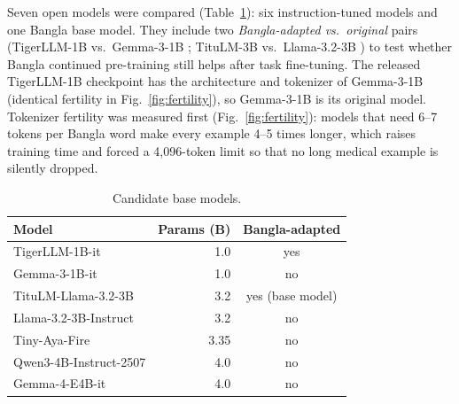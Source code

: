 Seven open models were compared (Table~\ref{tab:candidates}): six instruction-tuned models and one Bangla base model. They include two \emph{Bangla-adapted vs.\ original} pairs (TigerLLM-1B \cite{raihan2025tigerllm} vs.\ Gemma-3-1B \cite{gemma3}; TituLM-3B \cite{titulm2025} vs.\ Llama-3.2-3B \cite{meta2024llama32}) to test whether Bangla continued pre-training still helps after task fine-tuning. The released TigerLLM-1B checkpoint has the architecture and tokenizer of Gemma-3-1B (identical fertility in Fig.~\ref{fig:fertility}), so Gemma-3-1B is its original model. Tokenizer fertility was measured first (Fig.~\ref{fig:fertility}): models that need 6--7 tokens per Bangla word make every example 4--5 times longer, which raises training time and forced a 4,096-token limit so that no long medical example is silently dropped.

\begin{table}[!t]
\centering
\caption{Candidate base models.}
\label{tab:candidates}
\scriptsize
\begin{tabular}{@{}lrc@{}}
\toprule
Model & Params (B) & Bangla-adapted \\
\midrule
TigerLLM-1B-it \cite{raihan2025tigerllm} & 1.0 & yes \\
Gemma-3-1B-it \cite{gemma3} & 1.0 & no \\
TituLM-Llama-3.2-3B \cite{titulm2025} & 3.2 & yes (base model) \\
Llama-3.2-3B-Instruct \cite{meta2024llama32} & 3.2 & no \\
Tiny-Aya-Fire \cite{tinyaya} & 3.35 & no \\
Qwen3-4B-Instruct-2507 \cite{qwen3} & 4.0 & no \\
Gemma-4-E4B-it \cite{gemma4} & 4.0 & no \\
\bottomrule
\end{tabular}
\end{table}

